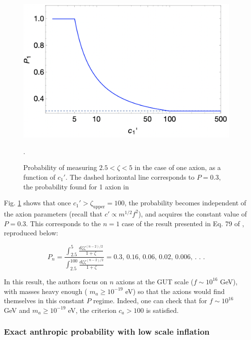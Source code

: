 \documentclass{article}
\begin{document}
\begin{figure}[h]
    \includegraphics[scale=0.5]{figs/1axion-prob.jpeg}
    \centering
    \caption{Probability of measuring $2.5<\zeta<5$ in the case of one axion, as a function of $c_1'$. The dashed horizontal line corresponds to $P=0.3$, the probability found for 1 axion in \cite{exploring-string-axiverse}}.
    \label{fig:1axion-prob}
\end{figure}

Fig. \ref{fig:1axion-prob} shows that once $c_1'>\zeta_\text{upper}=100$, the probability becomes independent of the axion parameters (recall that $c' \propto m^{1/2}f^2$), and acquires the constant value of $P=0.3$. This corresponds to the $n=1$ case of the result presented in Eq. 79 of \cite{exploring-string-axiverse}, reproduced below:

\begin{equation}
\label{eq:bookkeeping-result}
    P_n = \frac{\int_{2.5}^5 \frac{d\zeta \zeta^{(n-2)/2}}{1+\zeta}}{\int_{2.5}^{100}\frac{d\zeta \zeta^{(n-2)/2}}{1+\zeta}} = \text{0.3, 0.16, 0.06, 0.02, 0.006, . . .}
\end{equation}

\noindent In this result, the authors focus on $n$ axions at the GUT scale ($f\sim 10^{16}$ GeV), with masses heavy enough ( $m_a\geq10^{-19}$ eV) so that the axions would find themselves in this constant $P$ regime. Indeed, one can check that for $f\sim 10^{16}$ GeV and $m_a\geq10^{-19}$ eV, the criterion $c_a>100$ is satisfied.

\subsubsection{Exact anthropic probability with low scale inflation}
\end{document}
